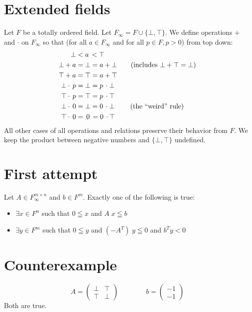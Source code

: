 \documentclass[]{article}
\begin{document}
\section {Extended fields}

Let $F$ be a totally ordered field.
Let $F_\infty = F \cup \{ \bot, \top \}$.
We define operations $+$ and $\cdot$ on $F_\infty$
so that
(for all $a \in F_\infty$ and for all $p \in F, p > 0$)
from top down:
\begin{align*}
	\bot <& \;a\, < \top \\
	\bot + a =& \;\bot = a + \bot \text{\qquad(includes $\bot + \top = \bot$)} \\
	\top + a =& \;\top = a + \top \\
	\bot \cdot\, p =& \;\bot = p \,\cdot \bot \\
	\top \cdot\, p =& \;\top = p \,\cdot \top \\
	\bot \cdot\, 0 =& \;\bot = 0 \,\cdot \bot \text{\qquad\;(the ``weird'' rule)} \\
	\top \cdot\, 0 =& \;\,0\, = 0 \,\cdot \top
\end{align*}
All other cases of all operations and relations
preserve their behavior from $F$.
We keep the product between negative numbers and
$\{ \bot, \top \}$ undefined.

\section{First attempt}

Let $A \in F_\infty^{m \times n}$ and $b \in F^m$.
Exactly one of the following is true:
\begin{itemize}
	\item $\exists x \in F^n$ such that
	$0 \leqq x$ and $A\; x \leqq b$
	\item $\exists y \in F^m$ such that
	$0 \leqq y$ and $(-A^T)\; y \leqq 0$ and $b^T y < 0$
\end{itemize}

\section{Counterexample}

$$
A =
\begin{pmatrix}
	\bot & \top\\
	\top & \bot
\end{pmatrix}
\qquad \qquad
b =
\begin{pmatrix}
	-1 \\
	-1
\end{pmatrix}
$$
Both are true.
\end{document}
